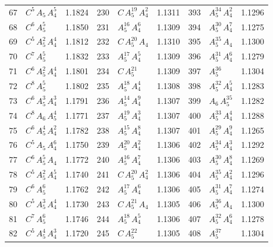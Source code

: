 \begin{longtable}{@{}rlr@{\quad}rlr@{\quad}rlr@{}}
67 & $C^{5}$\,$A_{5}$\,$A_{4}^{5}$ & 1.1824 & 230 & $C$\,$A_{5}^{19}$\,$A_{4}^{2}$ & 1.1311 & 393 & $A_{5}^{34}$\,$A_{4}^{2}$ & 1.1296 \\
68 & $C^{6}$\,$A_{5}^{5}$ & 1.1850 & 231 & $A_{5}^{16}$\,$A_{4}^{6}$ & 1.1309 & 394 & $A_{5}^{30}$\,$A_{4}^{7}$ & 1.1275 \\
69 & $C^{5}$\,$A_{5}^{2}$\,$A_{4}^{4}$ & 1.1812 & 232 & $C$\,$A_{5}^{20}$\,$A_{4}$ & 1.1310 & 395 & $A_{5}^{35}$\,$A_{4}$ & 1.1300 \\
70 & $C^{7}$\,$A_{5}^{5}$ & 1.1832 & 233 & $A_{5}^{17}$\,$A_{4}^{5}$ & 1.1309 & 396 & $A_{5}^{31}$\,$A_{4}^{6}$ & 1.1279 \\
71 & $C^{6}$\,$A_{5}^{2}$\,$A_{4}^{4}$ & 1.1801 & 234 & $C$\,$A_{5}^{21}$ & 1.1309 & 397 & $A_{5}^{36}$ & 1.1304 \\
72 & $C^{8}$\,$A_{5}^{5}$ & 1.1802 & 235 & $A_{5}^{18}$\,$A_{4}^{4}$ & 1.1308 & 398 & $A_{5}^{32}$\,$A_{4}^{5}$ & 1.1283 \\
73 & $C^{6}$\,$A_{5}^{3}$\,$A_{4}^{3}$ & 1.1791 & 236 & $A_{5}^{14}$\,$A_{4}^{9}$ & 1.1307 & 399 & $A_{6}$\,$A_{5}^{35}$ & 1.1282 \\
74 & $C^{8}$\,$A_{6}$\,$A_{5}^{4}$ & 1.1771 & 237 & $A_{5}^{19}$\,$A_{4}^{3}$ & 1.1307 & 400 & $A_{5}^{33}$\,$A_{4}^{4}$ & 1.1288 \\
75 & $C^{6}$\,$A_{5}^{4}$\,$A_{4}^{2}$ & 1.1782 & 238 & $A_{5}^{15}$\,$A_{4}^{8}$ & 1.1307 & 401 & $A_{5}^{29}$\,$A_{4}^{9}$ & 1.1265 \\
76 & $C^{5}$\,$A_{5}$\,$A_{4}^{6}$ & 1.1750 & 239 & $A_{5}^{20}$\,$A_{4}^{2}$ & 1.1306 & 402 & $A_{5}^{34}$\,$A_{4}^{3}$ & 1.1292 \\
77 & $C^{6}$\,$A_{5}^{5}$\,$A_{4}$ & 1.1772 & 240 & $A_{5}^{16}$\,$A_{4}^{7}$ & 1.1306 & 403 & $A_{5}^{30}$\,$A_{4}^{8}$ & 1.1269 \\
78 & $C^{5}$\,$A_{5}^{2}$\,$A_{4}^{5}$ & 1.1740 & 241 & $C$\,$A_{5}^{20}$\,$A_{4}^{2}$ & 1.1306 & 404 & $A_{5}^{35}$\,$A_{4}^{2}$ & 1.1296 \\
79 & $C^{6}$\,$A_{5}^{6}$ & 1.1762 & 242 & $A_{5}^{17}$\,$A_{4}^{6}$ & 1.1306 & 405 & $A_{5}^{31}$\,$A_{4}^{7}$ & 1.1274 \\
80 & $C^{5}$\,$A_{5}^{3}$\,$A_{4}^{4}$ & 1.1730 & 243 & $C$\,$A_{5}^{21}$\,$A_{4}$ & 1.1305 & 406 & $A_{5}^{36}$\,$A_{4}$ & 1.1300 \\
81 & $C^{7}$\,$A_{5}^{6}$ & 1.1746 & 244 & $A_{5}^{18}$\,$A_{4}^{5}$ & 1.1306 & 407 & $A_{5}^{32}$\,$A_{4}^{6}$ & 1.1278 \\
82 & $C^{5}$\,$A_{5}^{4}$\,$A_{4}^{3}$ & 1.1720 & 245 & $C$\,$A_{5}^{22}$ & 1.1305 & 408 & $A_{5}^{37}$ & 1.1304 \\

\end{longtable}
